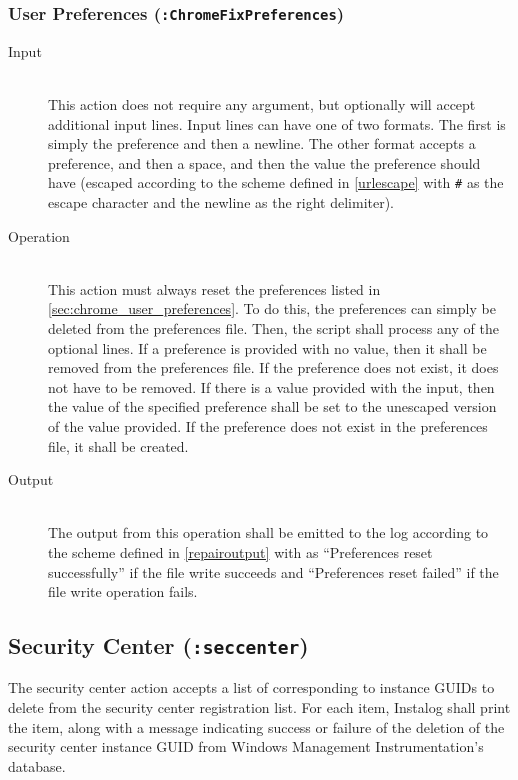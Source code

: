 \subsubsection{User Preferences (\texttt{:ChromeFixPreferences})}
\begin{description}
\item[Input] \hfill \\
This action does not require any argument, but optionally will accept additional
input lines.  Input lines can have one of two formats.  The first is simply the
preference and then a newline.  The other format accepts a preference, and then
a space, and then the value the preference should have (escaped according to
the scheme defined in \ref{urlescape} with \verb|#| as the escape character and
the newline as the right delimiter). 
\item[Operation] \hfill \\
This action must always reset the preferences listed in
\ref{sec:chrome_user_preferences}.  To do this, the preferences can simply be
deleted from the preferences file.  Then, the
script shall process any of the optional lines.  If a preference is provided
with no value, then it shall be removed from the preferences file.  If the
preference does not exist, it does not have to be removed.  If there is a value
provided with the input, then the value of the specified preference shall be
set to the unescaped version of the value provided.  If the preference does not
exist in the preferences file, it shall be created.
\item[Output] \hfill \\
The output from this operation shall be emitted to the log according to the
scheme defined in \ref{repairoutput} with  as ``Preferences reset
successfully'' if the file write succeeds and ``Preferences reset failed'' if
the file write operation fails.
\end{description} 

\subsection{Security Center (\texttt{:seccenter})}
The security center action accepts a list of  corresponding to
instance GUIDs to delete from the security center registration list. For each
item, Instalog shall print the item, along with a message indicating success or
failure of the deletion of the security center instance GUID from Windows
Management Instrumentation's database.

